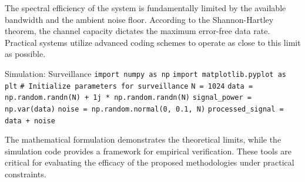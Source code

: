 The spectral efficiency of the system is fundamentally limited by the available bandwidth and the ambient noise floor. According to the Shannon-Hartley theorem, the channel capacity dictates the maximum error-free data rate. Practical systems utilize advanced coding schemes to operate as close to this limit as possible.

\begin{pythonbox}{Simulation: Surveillance}
\texttt{import numpy as np}
\texttt{import matplotlib.pyplot as plt}
\texttt{}
\texttt{\# Initialize parameters for surveillance}
\texttt{N = 1024}
\texttt{data = np.random.randn(N) + 1j * np.random.randn(N)}
\texttt{signal\_power = np.var(data)}
\texttt{noise = np.random.normal(0, 0.1, N)}
\texttt{processed\_signal = data + noise}
\end{pythonbox}

\vspace{0.5cm}
The mathematical formulation demonstrates the theoretical limits, while the simulation code provides a framework for empirical verification. These tools are critical for evaluating the efficacy of the proposed methodologies under practical constraints.

